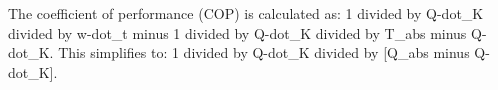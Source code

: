 The coefficient of performance (COP) is calculated as:  
1 divided by Q-dot_K divided by w-dot_t minus 1 divided by Q-dot_K divided by T_abs minus Q-dot_K.  
This simplifies to:  
1 divided by Q-dot_K divided by [Q_abs minus Q-dot_K].